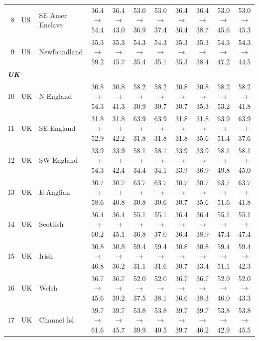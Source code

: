 \begin{table}[t]
{\begin{tabular}{rll c c c c c c c c}
8 & US & SE Amer Enclave & 36.4$\rightarrow$54.4 & 36.4$\rightarrow$43.0 & 53.0$\rightarrow$36.9 & 53.0$\rightarrow$37.4 & 36.4$\rightarrow$36.4 & 36.4$\rightarrow$38.7 & 53.0$\rightarrow$45.6 & 53.0$\rightarrow$45.3 \\
9 & US & Newfoundland & 35.3$\rightarrow$59.2 & 35.3$\rightarrow$45.7 & 54.3$\rightarrow$35.4 & 54.3$\rightarrow$35.1 & 35.3$\rightarrow$35.3 & 35.3$\rightarrow$38.4 & 54.3$\rightarrow$47.2 & 54.3$\rightarrow$44.5 \\
\midrule
\multicolumn{11}{l}{\textit{\textbf{UK}}} \\
10 & UK & N England & 30.8$\rightarrow$54.3 & 30.8$\rightarrow$41.3 & 58.2$\rightarrow$30.9 & 58.2$\rightarrow$30.7 & 30.8$\rightarrow$30.7 & 30.8$\rightarrow$35.3 & 58.2$\rightarrow$53.2 & 58.2$\rightarrow$41.8 \\
11 & UK & SE England & 31.8$\rightarrow$52.9 & 31.8$\rightarrow$42.2 & 63.9$\rightarrow$31.8 & 63.9$\rightarrow$31.8 & 31.8$\rightarrow$31.8 & 31.8$\rightarrow$35.6 & 63.9$\rightarrow$51.4 & 63.9$\rightarrow$37.6 \\
12 & UK & SW England & 33.9$\rightarrow$54.3 & 33.9$\rightarrow$42.4 & 58.1$\rightarrow$34.4 & 58.1$\rightarrow$34.1 & 33.9$\rightarrow$33.9 & 33.9$\rightarrow$36.9 & 58.1$\rightarrow$49.8 & 58.1$\rightarrow$45.0 \\
13 & UK & E Anglian & 30.7$\rightarrow$58.6 & 30.7$\rightarrow$40.8 & 63.7$\rightarrow$30.8 & 63.7$\rightarrow$30.6 & 30.7$\rightarrow$30.7 & 30.7$\rightarrow$35.6 & 63.7$\rightarrow$51.6 & 63.7$\rightarrow$41.8 \\
14 & UK & Scottish & 36.4$\rightarrow$60.2 & 36.4$\rightarrow$45.1 & 55.1$\rightarrow$36.8 & 55.1$\rightarrow$37.0 & 36.4$\rightarrow$36.4 & 36.4$\rightarrow$38.9 & 55.1$\rightarrow$47.4 & 55.1$\rightarrow$47.4 \\
15 & UK & Irish & 30.8$\rightarrow$46.8 & 30.8$\rightarrow$36.2 & 59.4$\rightarrow$31.1 & 59.4$\rightarrow$31.6 & 30.8$\rightarrow$30.7 & 30.8$\rightarrow$33.4 & 59.4$\rightarrow$51.1 & 59.4$\rightarrow$42.3 \\
16 & UK & Welsh & 36.7$\rightarrow$45.6 & 36.7$\rightarrow$39.2 & 52.0$\rightarrow$37.5 & 52.0$\rightarrow$38.1 & 36.7$\rightarrow$36.6 & 36.7$\rightarrow$38.3 & 52.0$\rightarrow$46.0 & 52.0$\rightarrow$43.3 \\
17 & UK & Channel Isl & 39.7$\rightarrow$61.6 & 39.7$\rightarrow$45.7 & 53.8$\rightarrow$39.9 & 53.8$\rightarrow$40.5 & 39.7$\rightarrow$39.7 & 39.7$\rightarrow$46.2 & 53.8$\rightarrow$42.9 & 53.8$\rightarrow$45.5 \\

\end{tabular}}
\end{table}

